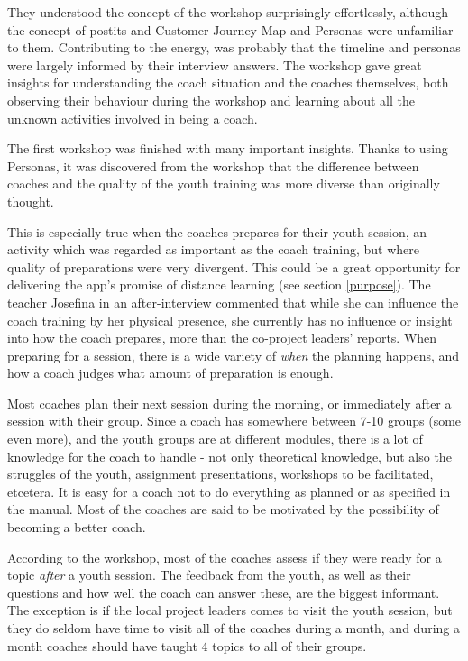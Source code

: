     They understood the concept of the workshop surprisingly effortlessly, although the concept of postits and Customer Journey Map and Personas were unfamiliar to them. Contributing to the energy, was probably that the timeline and personas were largely informed by their interview answers. The workshop gave great insights for understanding the coach situation and the coaches themselves, both observing their behaviour during the workshop and learning about all the unknown activities involved in being a coach.

    The first workshop was finished with many important insights. Thanks to using Personas, it was discovered from the workshop that the difference between coaches and the quality of the youth training was more diverse than originally thought.

    This is especially true when the coaches prepares for their youth session, an activity which was regarded as important as the coach training, but where quality of preparations were very divergent. This could be a great opportunity for delivering the app's promise of distance learning (see section \ref{purpose}). The teacher Josefina in an after-interview commented that while she can influence the coach training by her physical presence, she currently has no influence or insight into how the coach prepares, more than the co-project leaders' reports. When preparing for a session, there is a wide variety of \textit{when} the planning happens, and how a coach judges what amount of preparation is enough.

    Most coaches plan their next session during the morning, or immediately after a session with their group. Since a coach has somewhere between 7-10 groups (some even more), and the youth groups are at different modules, there is a lot of knowledge for the coach to handle - not only theoretical knowledge, but also the struggles of the youth, assignment presentations, workshops to be facilitated, etcetera. It is easy for a coach not to do everything as planned or as specified in the manual. Most of the coaches are said to be motivated by the possibility of becoming a better coach.

    According to the workshop, most of the coaches assess if they were ready for a topic \textit{after} a youth session. The feedback from the youth, as well as their questions and how well the coach can answer these, are the biggest informant. The exception is if the local project leaders comes to visit the youth session, but they do seldom have time to visit all of the coaches during a month, and during a month coaches should have taught 4 topics to all of their groups.

